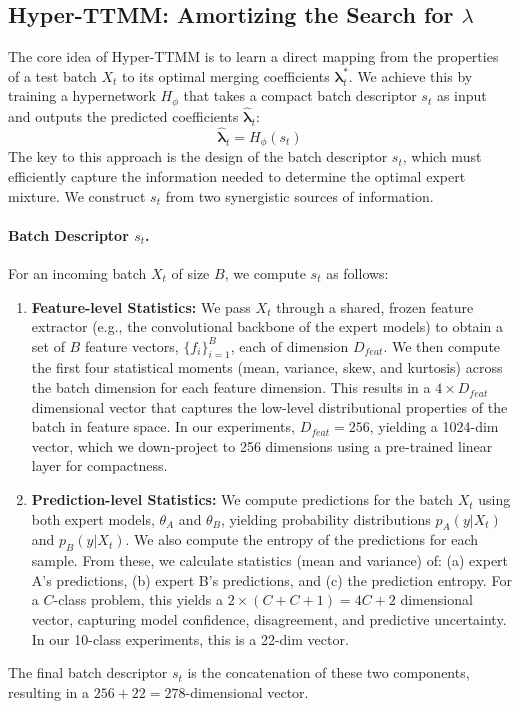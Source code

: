 \documentclass{article}
\theoremstyle{plain}
\theoremstyle{definition}
\theoremstyle{remark}
\begin{document}
\subsection{Hyper-TTMM: Amortizing the Search for $\lambda$}
The core idea of Hyper-TTMM is to learn a direct mapping from the properties of a test batch $X_t$ to its optimal merging coefficients $\boldsymbol{\lambda}^*_t$. We achieve this by training a hypernetwork $H_\phi$ that takes a compact batch descriptor $s_t$ as input and outputs the predicted coefficients $\hat{\boldsymbol{\lambda}}_t$:
\begin{equation}
\hat{\boldsymbol{\lambda}}_t = H_\phi(s_t)
\end{equation}
The key to this approach is the design of the batch descriptor $s_t$, which must efficiently capture the information needed to determine the optimal expert mixture. We construct $s_t$ from two synergistic sources of information.

\paragraph{Batch Descriptor $s_t$.}
For an incoming batch $X_t$ of size $B$, we compute $s_t$ as follows:
\begin{enumerate}
    \item \textbf{Feature-level Statistics:} We pass $X_t$ through a shared, frozen feature extractor (e.g., the convolutional backbone of the expert models) to obtain a set of $B$ feature vectors, $\{f_i\}_{i=1}^B$, each of dimension $D_{feat}$. We then compute the first four statistical moments (mean, variance, skew, and kurtosis) across the batch dimension for each feature dimension. This results in a $4 \times D_{feat}$ dimensional vector that captures the low-level distributional properties of the batch in feature space. In our experiments, $D_{feat}=256$, yielding a 1024-dim vector, which we down-project to 256 dimensions using a pre-trained linear layer for compactness.
    \item \textbf{Prediction-level Statistics:} We compute predictions for the batch $X_t$ using both expert models, $\theta_A$ and $\theta_B$, yielding probability distributions $p_A(y|X_t)$ and $p_B(y|X_t)$. We also compute the entropy of the predictions for each sample. From these, we calculate statistics (mean and variance) of: (a) expert A's predictions, (b) expert B's predictions, and (c) the prediction entropy. For a $C$-class problem, this yields a $2 \times (C + C + 1) = 4C+2$ dimensional vector, capturing model confidence, disagreement, and predictive uncertainty. In our 10-class experiments, this is a 22-dim vector.
\end{enumerate}
The final batch descriptor $s_t$ is the concatenation of these two components, resulting in a $256 + 22 = 278$-dimensional vector.
\end{document}
